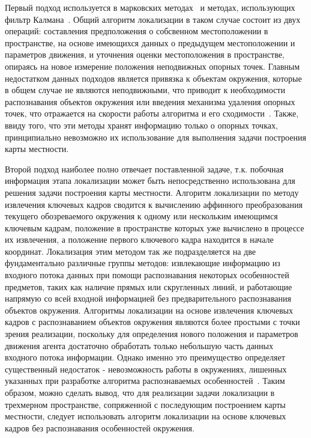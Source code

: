 Первый подход используется в марковских методах~\cite{MDPSLAM} и методах, использующих фильтр Калмана~\cite{EKFSLAM}. Общий алгоритм локализации в таком случае состоит из двух операций: составления предположения о собсвенном местоположении в пространстве, на основе имеющихся данных о предыдущем местоположении и параметров движения, и уточнения оценки местоположения в пространстве, опираясь на новое измерение положения неподвижных опорных точек. Главным недостатком данных подходов является привязка к объектам окружения, которые в общем случае не являются неподвижными, что приводит к необходимости распознавания объектов окружения или введения механизма удаления опорных точек, что отражается на скорости работы алгоритма и его сходимости~\cite{EKFSLAM}. Также, ввиду того, что эти методы хранят информацию только о опорных точках, принципиально невозможно их использование для выполнения задачи построения карты местности.


Второй подход наиболее полно отвечает поставленной задаче, т.к. побочная информация этапа локализации может быть непосредственно использована для решения задачи построения карты местности. Алгоритм локализации по методу извлечения ключевых кадров сводится к вычислению аффинного преобразования текущего обозреваемого окружения к одному или нескольким имеющимся ключевым кадрам, положение в пространстве которых уже вычислено в процессе их извлечения, а положение первого ключевого кадра находится в начале координат. Локализация этим методом так же подразделяется на две фундаментально различные группы методов: извлекающие информацию из входного потока данных при помощи распознавания некоторых особенностей предметов, таких как наличие прямых или скругленных линий, и работающие напрямую со всей входной информацией без предварительного распознавания объектов окружения. Алгоритмы локализации на основе извлечения ключевых кадров с распознаванием объектов окружения являются более простыми с точки зрения реализации, поскольку для определения нового положения и параметров движения агента достаточно обработать только небольшую часть данных входного потока информации. Однако именно это преимущество определяет существенный недостаток - невозможность работы в окружениях, лишенных указанных при разработке алгоритма распознаваемых особенностей~\cite{tum3DMonoSLAM}. Таким образом, можно сделать вывод, что для реализации задачи локализации в трехмерном пространстве, сопряженной с последующим построением карты местности, следует использовать алгоритм локализации на основе ключевых кадров без распознавания особенностей окружения.



